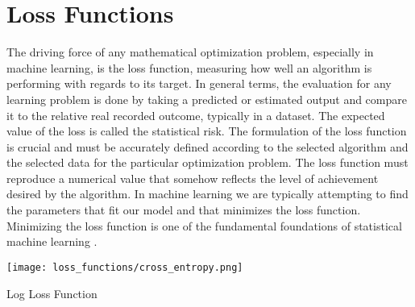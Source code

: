 \chapter{Loss Functions}
\label{ch:loss functions}

The driving force of any mathematical optimization problem, especially in machine learning, is the loss function, measuring how well an algorithm is performing with regards to its target. In general terms, the evaluation for any learning problem is done by taking a predicted or estimated output and compare it to the relative real recorded outcome, typically in a dataset. The expected value of the loss is called the statistical risk. The formulation of the loss function is crucial and must be accurately defined according to the selected algorithm and the selected data for the particular optimization problem. The loss function must reproduce a numerical value that somehow reflects the level of achievement desired by the algorithm.  In machine learning we are typically attempting to find the parameters that fit our model and that minimizes the loss function. Minimizing the loss function is one of the fundamental foundations of statistical machine learning \citep{pmlr-v32-yanga14}. 

\begin{marginfigure}%
	\texttt{[image: loss\_functions/cross\_entropy.png]}
	\caption{Log Loss Function}
	\label{fig:logloss}
\end{marginfigure}


